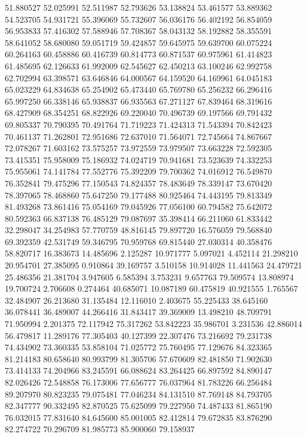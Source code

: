 51.880527
52.025991
52.511987
52.793626
53.138824
53.461577
53.889362
54.523705
54.931721
55.396069
55.732607
56.036176
56.402192
56.854059
56.953833
57.416302
57.588946
57.708367
58.043132
58.192882
58.355591
58.641052
58.680080
59.051719
59.424857
59.645975
59.639700
60.075224
60.264163
60.458886
60.416739
60.814773
60.871537
60.975961
61.414823
61.485695
62.126633
61.992009
62.545627
62.450213
63.100246
62.992758
62.702994
63.398571
63.646846
64.000567
64.159520
64.169961
64.045183
65.023229
64.834638
65.254902
65.473440
65.769780
65.256232
66.296416
65.997250
66.338146
65.938837
66.935563
67.271127
67.839464
68.319616
68.427909
68.354251
68.822926
69.220040
70.496739
69.197566
69.791432
69.805337
70.790395
70.491764
71.719223
71.424313
71.543394
70.842423
70.461137
71.262801
72.951686
72.637010
71.564071
72.745664
74.867667
72.078267
71.603162
73.575257
73.972559
73.979507
73.663228
72.592305
73.415351
75.958009
75.186932
74.024719
70.941681
73.523639
74.332253
75.955061
74.141784
77.552776
75.392209
79.700362
74.016912
76.549870
76.352841
79.475296
77.150543
74.824357
78.483649
78.339147
73.670420
78.397065
78.468860
75.647250
79.177488
80.925464
74.443195
79.813349
81.493268
73.861416
75.054169
79.045926
77.056100
60.794582
75.642072
80.592363
66.837138
76.485129
79.087697
35.398414
66.211060
61.833442
32.298047
34.254983
57.770759
48.816145
79.897720
16.576059
79.568840
69.392359
42.531749
59.346795
70.959768
69.815440
27.030314
40.358476
58.820717
16.383673
14.485696
2.125287
10.971777
5.097021
4.452114
21.298210
20.954701
27.385095
0.910864
39.169757
3.510158
10.914028
11.441563
24.479721
25.486356
21.381704
3.947605
6.585394
3.753231
9.657763
79.509574
13.808974
19.700724
2.706608
0.274464
40.685071
10.087189
60.475819
40.921555
1.765567
32.484907
26.213680
31.135484
12.116010
2.403675
55.225433
38.645160
36.078441
36.489007
44.266416
31.843417
39.369009
13.498210
48.709791
71.950994
2.201375
72.117942
75.317262
53.842223
35.986701
3.231536
42.886014
56.479817
11.289176
77.305403
40.127399
22.307476
73.216692
79.231738
74.434902
73.360335
53.858104
71.025772
75.760495
77.129676
84.323365
81.214183
80.658640
80.993799
81.305706
57.670609
82.481850
71.902630
73.414133
74.204966
83.245591
66.088624
83.264425
66.897592
84.890147
82.026426
72.548858
76.173006
77.656777
76.037964
81.783226
66.256484
89.207970
80.823235
79.075481
77.046234
84.131510
87.769148
84.793705
82.347777
90.332495
82.870525
75.625099
79.227950
74.487433
81.865190
76.032015
77.831640
84.645600
85.001005
82.412814
79.672835
83.876290
82.274722
70.296709
81.985773
85.900060
79.158937
